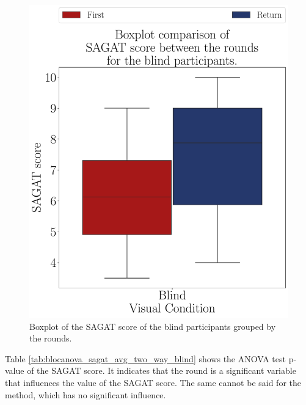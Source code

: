 \begin{figure}[!htb]
    \centering
    \includegraphics[width = 0.75\linewidth]{3 - Resultados/Figuras/boxplot_sagat_blind_rounds.pdf}
    \caption{Boxplot of the SAGAT score of the blind participants grouped by the rounds.}
    \label{fig:boxplot_sagat_blind_rounds}
\end{figure}

Table \ref{tab:blocanova_sagat_avg_two_way_blind} shows the ANOVA test p-value of the SAGAT score. It indicates that the round is a significant variable that influences the value of the SAGAT score. The same cannot be said for the method, which has no significant influence.

